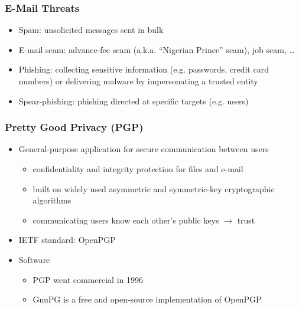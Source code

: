 \documentclass[final]{article}
\begin{document}
\subsubsection*{E-Mail Threats}
\begin{itemize}[nosep]
    \item Spam: unsolicited messages sent in bulk
    \item E-mail scam: advance-fee scam (a.k.a. ``Nigerian Prince'' scam), job scam, \dots
    \item Phishing: collecting sensitive information (e.g. passwords, credit card numbers) or delivering malware by impersonating a trusted entity
    \item Spear-phishing: phishing directed at specific targets (e.g. users)
\end{itemize}
\subsubsection*{Pretty Good Privacy (PGP)}
\begin{itemize}[nosep]
    \item General-purpose application for secure communication between users
          \begin{itemize}[nosep]
              \item confidentiality and integrity protection for files and e-mail
              \item built on widely used asymmetric and symmetric-key cryptographic algorithms
              \item communicating users know each other's public keys $\rightarrow$ trust
          \end{itemize}
    \item IETF standard: OpenPGP
    \item Software
          \begin{itemize}[nosep]
              \item PGP went commercial in 1996
              \item GnuPG is a free and open-source implementation of OpenPGP
          \end{itemize}
\end{itemize}
\end{document}
